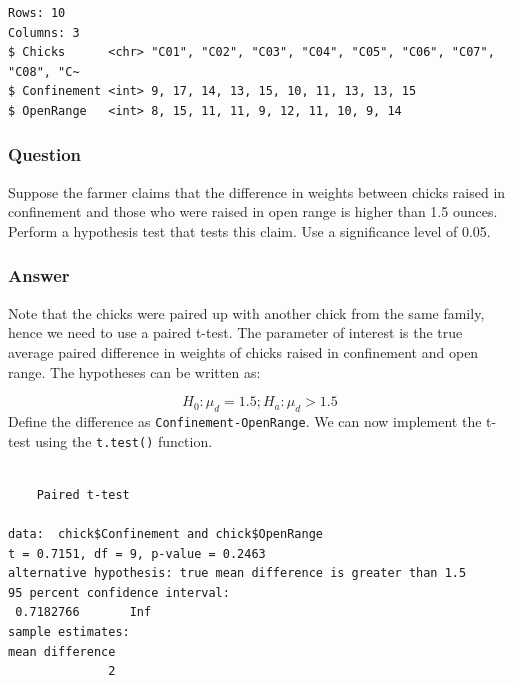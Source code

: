\documentclass[
  letterpaper,
  DIV=11,
  numbers=noendperiod]{scrartcl}
\newenvironment{Shaded}{\begin{snugshade}}{\end{snugshade}}
\newcommand{\AttributeTok}[1]{\textcolor[rgb]{0.40,0.45,0.13}{#1}}
\newcommand{\ConstantTok}[1]{\textcolor[rgb]{0.56,0.35,0.01}{#1}}
\newcommand{\FloatTok}[1]{\textcolor[rgb]{0.68,0.00,0.00}{#1}}
\newcommand{\FunctionTok}[1]{\textcolor[rgb]{0.28,0.35,0.67}{#1}}
\newcommand{\NormalTok}[1]{\textcolor[rgb]{0.00,0.23,0.31}{#1}}
\newcommand{\OtherTok}[1]{\textcolor[rgb]{0.00,0.23,0.31}{#1}}
\newcommand{\SpecialCharTok}[1]{\textcolor[rgb]{0.37,0.37,0.37}{#1}}
\newcommand{\StringTok}[1]{\textcolor[rgb]{0.13,0.47,0.30}{#1}}
\begin{document}
\begin{verbatim}
Rows: 10
Columns: 3
$ Chicks      <chr> "C01", "C02", "C03", "C04", "C05", "C06", "C07", "C08", "C~
$ Confinement <int> 9, 17, 14, 13, 15, 10, 11, 13, 13, 15
$ OpenRange   <int> 8, 15, 11, 11, 9, 12, 11, 10, 9, 14
\end{verbatim}

\subsubsection{Question}

Suppose the farmer claims that the difference in weights between chicks
raised in confinement and those who were raised in open range is higher
than 1.5 ounces. Perform a hypothesis test that tests this claim. Use a
significance level of 0.05.

\subsubsection{Answer}

Note that the chicks were paired up with another chick from the same
family, hence we need to use a paired t-test. The parameter of interest
is the true average paired difference in weights of chicks raised in
confinement and open range. The hypotheses can be written as:

\[
H_0: \mu_d = 1.5; H_a: \mu_d > 1.5
\] Define the difference as \texttt{Confinement-OpenRange}. We can now
implement the t-test using the \texttt{t.test()} function.

\begin{Shaded}
\end{Shaded}

\begin{verbatim}

    Paired t-test

data:  chick$Confinement and chick$OpenRange
t = 0.7151, df = 9, p-value = 0.2463
alternative hypothesis: true mean difference is greater than 1.5
95 percent confidence interval:
 0.7182766       Inf
sample estimates:
mean difference 
              2 
\end{verbatim}
\end{document}
